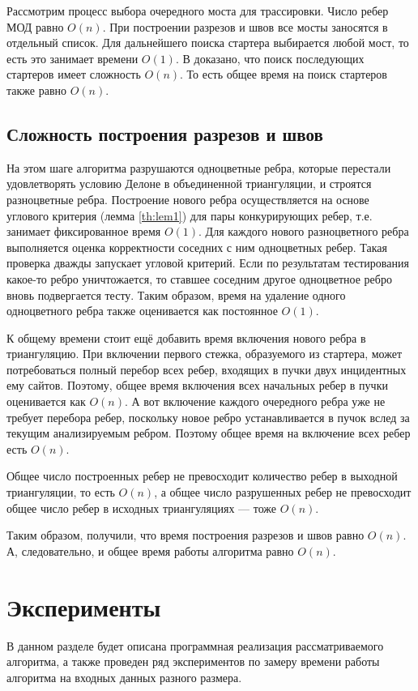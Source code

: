 \documentclass[12pt]{article}
\begin{document}
Рассмотрим процесс выбора очередного моста для трассировки.
Число ребер МОД равно $O(n)$.
При построении разрезов и швов все мосты заносятся в отдельный список.
Для дальнейшего поиска стартера выбирается любой мост, то есть это занимает времени $O(1)$.
В \cite{MestOverlap} доказано, что поиск последующих стартеров имеет сложность $O(n)$.
То есть общее время на поиск стартеров также равно $O(n)$.

\subsection{Сложность построения разрезов и швов}
На этом шаге алгоритма разрушаются одноцветные ребра,
которые перестали удовлетворять условию Делоне в объединенной триангуляции,
и строятся разноцветные ребра.
Построение нового ребра осуществляется на основе углового критерия (лемма \ref{th:lem1}) для пары конкурирующих ребер,
т.е. занимает фиксированное время $O(1)$.
Для каждого нового разноцветного ребра выполняется оценка корректности соседних с ним одноцветных ребер.
Такая проверка дважды запускает угловой критерий.
Если по результатам тестирования какое-то ребро уничтожается, то ставшее соседним другое одноцветное ребро вновь подвергается тесту.
Таким образом, время на удаление одного одноцветного ребра также оценивается как постоянное $O(1)$.

К общему времени стоит ещё добавить время включения нового ребра в триангуляцию.
При включении первого стежка, образуемого из стартера, может потребоваться полный перебор всех ребер, входящих в пучки двух инцидентных ему сайтов. Поэтому, общее время включения всех начальных ребер в пучки оценивается как $O(n)$.
А вот включение каждого очередного ребра уже не требует перебора ребер,
поскольку новое ребро устанавливается в пучок вслед за текущим анализируемым ребром.
Поэтому общее время на включение всех ребер есть $O(n)$.

Общее число построенных ребер не превосходит количество ребер в выходной триангуляции, то есть $O(n)$,
а общее число разрушенных ребер не превосходит общее число ребер в исходных триангуляциях --- тоже $O(n)$.

Таким образом, получили, что время построения разрезов и швов равно $O(n)$.
А, следовательно, и общее время работы алгоритма равно $O(n)$.

\section{Эксперименты}
В данном разделе будет описана программная реализация рассматриваемого алгоритма,
а также проведен ряд экспериментов по замеру времени работы алгоритма на входных данных разного размера.
\end{document}
